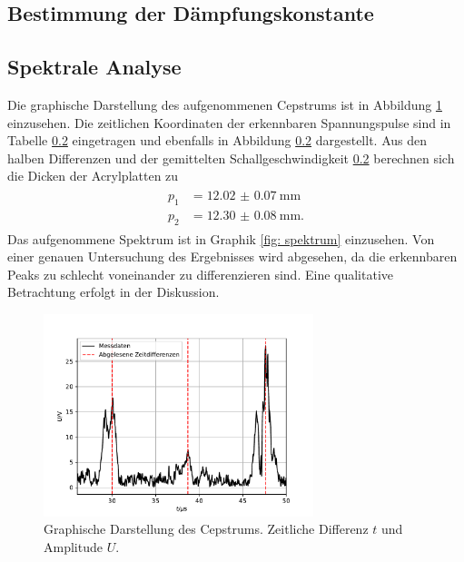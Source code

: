 \subsection{Bestimmung der Dämpfungskonstante}


\subsection{Spektrale Analyse}
Die graphische Darstellung des aufgenommenen Cepstrums ist in Abbildung \ref{fig: cepstrum} einzusehen.
Die zeitlichen Koordinaten der erkennbaren Spannungspulse sind in Tabelle \ref{} eingetragen und ebenfalls in
Abbildung \ref{} dargestellt. Aus den halben Differenzen und der gemittelten Schallgeschwindigkeit \ref{} berechnen sich die
Dicken der Acrylplatten zu
\begin{align}
  \begin{aligned}
    p_1 &= \SI{+12.02(7)}{\milli\meter}\\
    p_2 &= \SI{+12.30(8)}{\milli\meter}.
  \end{aligned}
\end{align}
Das aufgenommene Spektrum ist in Graphik \ref{fig: spektrum} einzusehen. Von einer genauen Untersuchung des Ergebnisses wird abgesehen, da
die erkennbaren Peaks zu schlecht voneinander zu differenzieren sind. Eine qualitative Betrachtung erfolgt in der Diskussion.
\begin{figure}[H]
  \centering
  \includegraphics[width = 0.7\textwidth]{../Messdaten/plots/cepstrum.pdf}
  \caption{Graphische Darstellung des Cepstrums. Zeitliche Differenz $t$ und Amplitude $U$.}
  \label{fig: cepstrum}
\end{figure}

